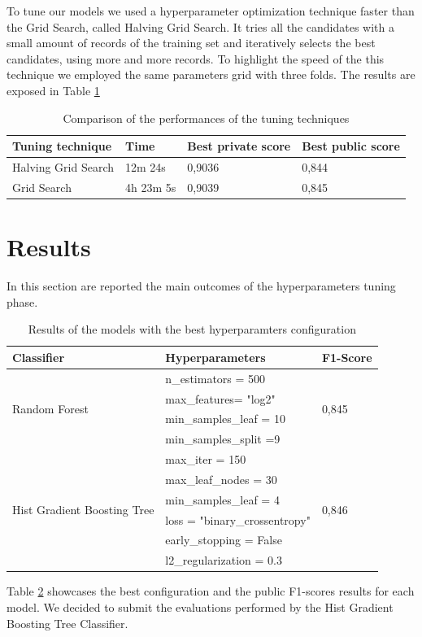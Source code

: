 \documentclass[conference]{IEEEtran}
\begin{document}
To tune our models we used a hyperparameter optimization technique faster than the Grid Search, called Halving Grid Search\cite{halving}. It tries all the candidates with a small amount of records of the training set and iteratively selects the best candidates, using more and more records\cite{halving_explanation}. To highlight the speed of the this technique we employed the same parameters grid with three folds. The results are exposed in Table \ref{tab:tuning_tech}
\begin{table}[h]
\begin{tabular}{@{}llll@{}}
\toprule
\textbf{Tuning technique}    & \textbf{Time}      & \textbf{Best private score} & \textbf{Best public score} \\ \midrule
Halving Grid Search & 12m 24s   & 0,9036             & 0,844             \\
Grid Search         & 4h 23m 5s & 0,9039             & 0,845             \\ \bottomrule
\end{tabular}
\caption{Comparison of the performances of the tuning techniques}
\label{tab:tuning_tech}
\end{table}



\section{Results}\label{sec:results}
In this section are reported the main outcomes of the hyperparameters tuning phase.
\begin{table}[h]
\begin{tabular}{@{}lll@{}}
\toprule
\textbf{Classifier} & \textbf{Hyperparameters}               & \textbf{F1-Score} \\ \midrule
\multirow{4}{*}{Random Forest}               & n\_estimators = 500 & \multirow{4}{*}{0,845} \\
           & max\_features= "log2"         &          \\
           & min\_samples\_leaf = 10       &          \\
           & min\_samples\_split =9        &          \\ \midrule
\multirow{6}{*}{Hist Gradient Boosting Tree} & max\_iter = 150     & \multirow{6}{*}{0,846} \\
           & max\_leaf\_nodes = 30         &          \\
           & min\_samples\_leaf = 4        &          \\
           & loss = "binary\_crossentropy" &          \\
           & early\_stopping = False       &          \\
           & l2\_regularization = 0.3      &          \\ \bottomrule
\end{tabular}
\caption{Results of the models with the best hyperparamters configuration}
\label{tab:results}
\end{table}
Table \ref{tab:results} showcases the best configuration and the public F1-scores results for each model.
We decided to submit the evaluations performed by the Hist Gradient Boosting Tree Classifier.
\end{document}
